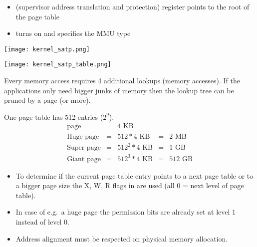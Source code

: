 \newpar{}
\begin{itemize}
    \item {} (supervisor address translation and protection) register points to the root of the page table
    \item {} turns on and specifies the MMU type
\end{itemize}
\begin{center}
    \texttt{[image: kernel\_satp.png]}
\end{center}
\begin{center}
    \texttt{[image: kernel\_satp\_table.png]}
\end{center}

\newpar{}

Every memory access requires 4 additional lookups (memory accesses). If the applications only need bigger junks of memory then the lookup tree can be pruned by a page (or more).

\newpar{}
One page table has 512 entries ($2^9$).
\begin{align*}
    \text{page}       & = & 4\text{~KB}         &   &               \\
    \text{Huge page}  & = & 512 * 4\text{~KB}   & = & 2\text{~MB}   \\
    \text{Super page} & = & 512^2 * 4\text{~KB} & = & 1\text{~GB}   \\
    \text{Giant page} & = & 512^3 * 4\text{~KB} & = & 512\text{~GB}
\end{align*}

\begin{itemize}
    \item To determine if the current page table entry points to a next page table or to a bigger page size the X, W, R flags in are used (all 0 = next level of page table). 
    \item In case of e.g.\ a huge page the permission bits are already set at level 1 instead of level 0.
    \item Address alignment must be respected on physical memory allocation.
\end{itemize}

